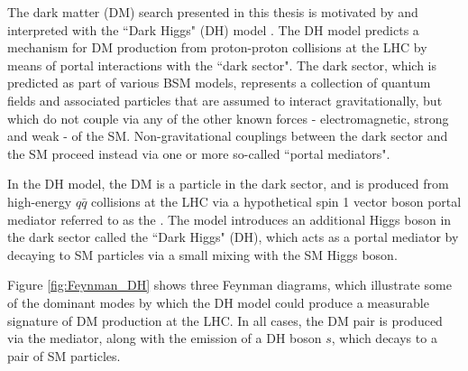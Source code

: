 \label{chapter:dh_model}

The dark matter (DM) search presented in this thesis is motivated by and interpreted with the ``Dark Higgs" (DH) model \cite{Duerr2017}. The DH model predicts a mechanism for DM production from proton-proton collisions at the LHC by means of portal interactions with the ``dark sector". The dark sector, which is predicted as part of various BSM models, represents a collection of quantum fields and associated particles that are assumed to interact gravitationally, but which do not couple via any of the other known forces - electromagnetic, strong and weak - of the SM. Non-gravitational couplings between the dark sector and the SM proceed instead via one or more so-called ``portal mediators". 

In the DH model, the DM is a particle in the dark sector, and is produced from high-energy \(q\bar{q}\) collisions at the LHC via a hypothetical spin 1 vector boson portal mediator referred to as the \Zprime. The model introduces an additional Higgs boson in the dark sector called the ``Dark Higgs" (DH), which acts as a portal mediator by decaying to SM particles via a small mixing with the SM Higgs boson. 

Figure \ref{fig:Feynman_DH} shows three Feynman diagrams, which illustrate some of the dominant modes by which the DH model could produce a measurable signature of DM production at the LHC. In all cases, the DM pair is produced via the \Zprime mediator, along with the emission of a DH boson \(s\), which decays to a pair of SM particles. 

